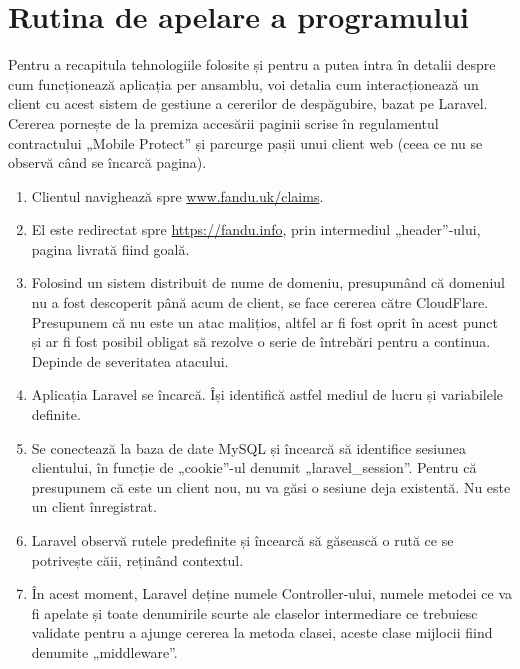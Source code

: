 \section{Rutina de apelare a programului}

	Pentru a recapitula tehnologiile folosite și pentru a putea intra în detalii despre cum funcționează aplicația per ansamblu, voi detalia cum interacționează un client cu acest sistem de gestiune a cererilor de despăgubire, bazat pe Laravel.
	Cererea pornește de la premiza accesării paginii scrise în regulamentul contractului „Mobile Protect” și parcurge pașii unui client web (ceea ce nu se observă când se încarcă pagina).
	\begin{enumerate}
		\item
			Clientul navighează spre \url{www.fandu.uk/claims}.
		\item
			El este redirectat spre \url{https://fandu.info}, prin intermediul „header”-ului, pagina livrată fiind goală.
		\item
			Folosind un sistem distribuit de nume de domeniu, presupunând că domeniul nu a fost descoperit până acum de client, se face cererea către CloudFlare.
			Presupunem că nu este un atac malițios, altfel ar fi fost oprit în acest punct și ar fi fost posibil obligat să rezolve o serie de întrebări pentru a continua.
			Depinde de severitatea atacului.
		\item
			Aplicația Laravel se încarcă. Își identifică astfel mediul de lucru și variabilele definite.
		\item
			Se conectează la baza de date MySQL și încearcă să identifice sesiunea clientului, în funcție de „cookie”-ul denumit „laravel\_session”.
			Pentru că presupunem că este un client nou, nu va găsi o sesiune deja existentă.
			Nu este un client înregistrat.
		\item
			Laravel observă rutele predefinite și încearcă să găsească o rută ce se potrivește căii, reținând contextul.
		\item
			În acest moment, Laravel deține numele Controller-ului, numele metodei ce va fi apelate și toate denumirile scurte ale claselor intermediare ce trebuiesc validate pentru a ajunge cererea la metoda clasei, aceste clase mijlocii fiind denumite „middleware”.


\end{enumerate}
